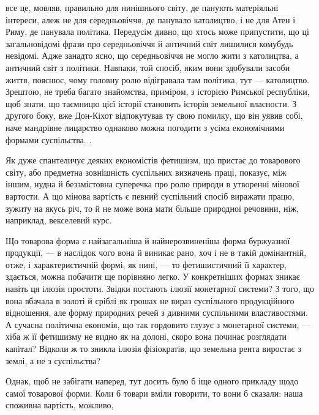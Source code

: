 {все це, мовляв, правильно для нинішнього світу, де панують матеріяльні
інтереси, алеж не для середньовіччя, де панувало католицтво, і не для
Атен і Риму, де панувала політика. Передусім дивно, що хтось може
припустити, що ці загальновідомі фрази про середньовіччя й античний
світ лишилися комубудь невідомі. Адже занадто ясно, що середньовіччя
не могло жити з католицтва, а античний світ з політики. Навпаки, той
спосіб, яким вони здобували засоби життя, пояснює, чому головну ролю
відігравала там політика, тут — католицтво. Зрештою, не треба багато
знайомства, приміром, з історією Римської республіки, щоб знати, що
таємницю цієї історії становить історія земельної власности. З другого
боку, вже Дон-Кіхот відпокутував ту свою помилку, що він уявив собі,
наче мандрівне лицарство однаково можна погодити з усіма економічними
формами суспільства.
}.

Як дуже спантеличує деяких економістів фетишизм, що пристає
до товарового світу, або предметна зовнішність суспільних
визначень праці, показує, між іншим, нудна й беззмістовна суперечка
про ролю природи в утворенні мінової вартости. А що
мінова вартість є певний суспільний спосіб виражати працю,
зужиту на якусь річ, то й не може вона мати більше природної
речовини, ніж, наприклад, векселевий курс.

Що товарова форма є найзагальніша й найнерозвиненіша
форма буржуазної продукції, — в наслідок чого вона й виникає
рано, хоч і не в такій домінантній, отже, і характеристичній
формі, як нині, — то фетишистичний її характер, здається, можна
побачити ще порівняно легко. У конкретніших формах зникає
навіть ця ілюзія простоти. Звідки постають ілюзії монетарної
системи? З того, що вона вбачала в золоті й сріблі як грошах не
вираз суспільного продукційного відношення, але форму природних
речей з дивними суспільними властивостями. А сучасна політична
економія, що так гордовито глузує з монетарної системи, —
хіба ж її фетишизму не видно як на долоні, скоро вона починає
розглядати капітал? Відколи ж то зникла ілюзія фізіократів,
що земельна рента виростає з землі, а не з суспільства?

Однак, щоб не забігати наперед, тут досить було б іще одного
прикладу щодо самої товарової форми. Коли б товари вміли говорити,
то вони б сказали: наша споживна вартість, можливо,
\parbreak{}  %
